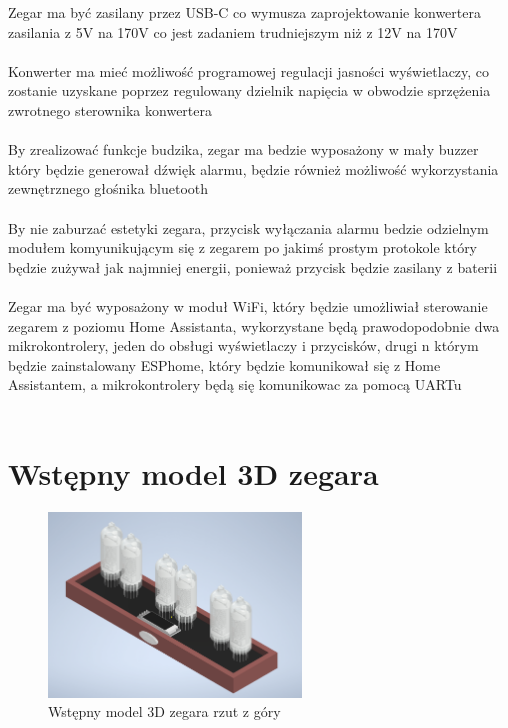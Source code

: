 \documentclass{article}
\begin{document}
Zegar ma być zasilany przez USB-C co wymusza zaprojektowanie konwertera zasilania z 5V na 170V co jest zadaniem trudniejszym niż z 12V na 170V\\\\
Konwerter ma mieć możliwość programowej regulacji jasności wyświetlaczy, co zostanie uzyskane poprzez regulowany dzielnik napięcia w obwodzie sprzężenia zwrotnego sterownika konwertera\\\\
By zrealizować funkcje budzika, zegar ma bedzie wyposażony w mały buzzer który będzie generował dźwięk alarmu, będzie również możliwość wykorzystania zewnętrznego głośnika bluetooth\\\\
By nie zaburzać estetyki zegara, przycisk wyłączania alarmu bedzie odzielnym modułem komyunikującym się z zegarem po jakimś prostym protokole który będzie zużywał jak najmniej energii, ponieważ przycisk będzie zasilany z baterii\\\\
Zegar ma być wyposażony w moduł WiFi, który będzie umożliwiał sterowanie zegarem z poziomu Home Assistanta, wykorzystane będą prawodopodobnie dwa mikrokontrolery, 
jeden do obsługi wyświetlaczy i przycisków, drugi n którym będzie zainstalowany ESPhome, który będzie komunikował się z Home Assistantem, a mikrokontrolery będą się komunikowac za pomocą UARTu \\\\

\section{Wstępny model 3D zegara}

\begin{figure}[H]
    \centering
    \includegraphics[width=0.6\textwidth]{model1.png}
    \caption{Wstępny model 3D zegara rzut z góry}
\end{figure}
\end{document}
